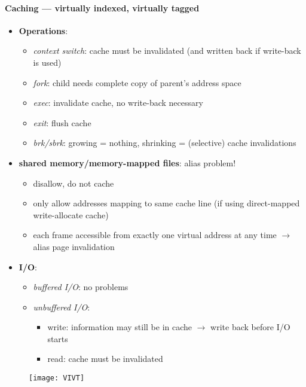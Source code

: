 \paragraph{Caching --- virtually indexed, virtually tagged}
\begin{itemize}
  \item \textbf{Operations}:
  \begin{itemize}
    \item \emph{context switch}: cache must be invalidated (and written back if write-back is used)
    \item \emph{fork}: child needs complete copy of parent's address space
    \item \emph{exec}: invalidate cache, no write-back necessary
    \item \emph{exit}: flush cache
    \item \emph{brk/sbrk}: growing = nothing, shrinking = (selective) cache invalidations
  \end{itemize}
  \item \textbf{shared memory/memory-mapped files}: alias problem!
  \begin{itemize}
    \item disallow, do not cache
    \item only allow addresses mapping to same cache line (if using direct-mapped write-allocate cache)
    \item each frame accessible from exactly one virtual address at any time $ \to $ alias page invalidation
  \end{itemize}
  \item \textbf{I/O}:
  \begin{itemize}
    \item \emph{buffered I/O}: no problems 
    \item \emph{unbuffered I/O}:
    \begin{itemize}
      \item write: information may still be in cache $ \to $ write back before I/O starts
      \item read: cache must be invalidated
    \end{itemize}
  \end{itemize}
\end{itemize}
\begin{figure}[h]\centering\label{VIVT}\texttt{[image: VIVT]}\end{figure}


